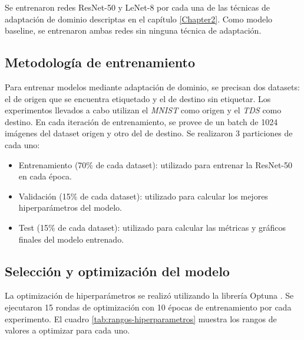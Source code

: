Se entrenaron redes ResNet-50 \parencite{he2016deep} y LeNet-8 \parencite{lecun1998gradient} por cada una de las t\'ecnicas de adaptaci\'on de dominio descriptas en el cap\'itulo
\ref{Chapter2}. Como modelo baseline, se entrenaron ambas redes sin ninguna t\'ecnica de adaptaci\'on.

\subsection{Metodolog\'ia de entrenamiento}

Para entrenar modelos mediante adaptaci\'on de dominio, se precisan dos datasets: el de origen que se encuentra
etiquetado y el de destino sin etiquetar. Los experimentos llevados a cabo utilizan el {\it MNIST} como origen y el
    {\it TDS} como destino. En cada iteraci\'on de entrenamiento, se provee de un batch de 1024 im\'agenes del dataset
origen y otro del de destino. Se realizaron 3 particiones de cada uno:

\begin{itemize}
    \item Entrenamiento (70\% de cada dataset): utilizado para entrenar la ResNet-50 en cada \'epoca.
    \item Validaci\'on (15\% de cada dataset): utilizado para calcular los mejores hiperpar\'ametros del modelo.
    \item Test (15\% de cada dataset): utilizado para calcular las m\'etricas y gr\'aficos finales del modelo entrenado.
\end{itemize}

\subsection{Selecci\'on y optimizaci\'on del modelo}

La optimizaci\'on de hiperpar\'ametros se realiz\'o utilizando la librer\'ia Optuna \parencite{optuna_2019}. Se ejecutaron 15 rondas de optimizaci\'on con 10 \'epocas de entrenamiento por cada experimento.
El cuadro \ref{tab:rangos-hiperparametros} muestra los rangos de valores a optimizar para cada uno.

